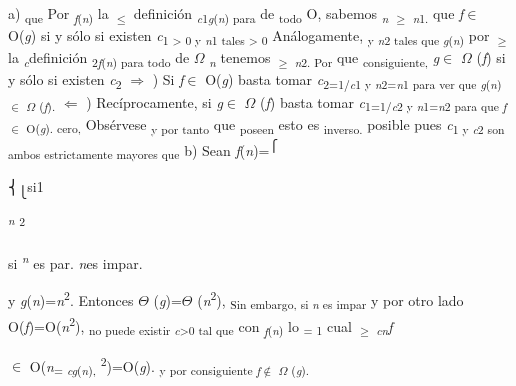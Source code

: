 \documentclass[12pt]{article}
\renewcommand{\_}{\kern-1.5pt\textunderscore\kern-1.5pt}
\begin{document}
{\fontsize{10pt}{12.0pt}\selectfont a) \textsubscript{que }Por \textit{\textsubscript{f}}\textsubscript{(\textit{n}) }la \textsubscript{$ \leq $  }definición \textit{\textsubscript{c}}\textsubscript{1\textit{g}(\textit{n}) para }de \textsubscript{todo }O, sabemos \textit{\textsubscript{n }}\textsubscript{$ \geq $  \textit{n}1. }que \textit{f}$ \in $ O(\textit{g}) si y sólo si existen \textit{c}\textsubscript{1 > 0 y \textit{n}1 tales > 0 }Análogamente, \textsubscript{y \textit{n}2 tales que \textit{g}(\textit{n}) }por \textsubscript{$ \geq $  }la \textit{\textsubscript{c}}definición \textsubscript{2\textit{f}(\textit{n}) para todo }de $ \Omega $  \textit{\textsubscript{n }}tenemos \textsubscript{$ \geq $  \textit{n}2. Por }que \textsubscript{consiguiente, }\textit{g}$ \in $ $ \Omega $ (\textit{f}) si y sólo si existen \textit{c}\textsubscript{2 }$ \Rightarrow $ ) Si \textit{f}$ \in $ O(\textit{g}) basta tomar \textit{c}\textsubscript{2=1/\textit{c}1 y \textit{n}2=\textit{n}1 para ver que \textit{g}(\textit{n})$ \in $ $ \Omega $ (\textit{f}). }$ \Leftarrow $ ) Recíprocamente, si \textit{g}$ \in $ $ \Omega $ (\textit{f}) basta tomar \textit{c}\textsubscript{1=1/\textit{c}2 y \textit{n}1=\textit{n}2 para que \textit{f}$ \in $ O(\textit{g}). cero, }Obsérvese \textsubscript{y por tanto }que \textsubscript{poseen }esto es \textsubscript{inverso. }posible pues \textit{c}\textsubscript{1 y \textit{c}2 son ambos estrictamente mayores que }b) Sean \textit{f}(\textit{n})=\textsuperscript{⎧ }\par}\par

{\fontsize{11pt}{13.2pt}\selectfont ⎨\textsubscript{⎩}si1 \par}\par

\textit{\textsuperscript{n }}\textsuperscript{2 }\par

\begin{Center}
{\fontsize{11pt}{13.2pt}\selectfont si \textit{\textsuperscript{n }}es par. \textit{n}es impar. {\fontsize{10pt}{12.0pt}\selectfont y \textit{g}(\textit{n})=\textit{n}\textsuperscript{2}. Entonces $ \Theta $ (\textit{g})=$ \Theta $ (\textit{n}\textsuperscript{2}), \textsubscript{Sin embargo, si \textit{n }es impar }y por otro lado O(\textit{f})=O(\textit{n}\textsuperscript{2}), \textsubscript{no puede existir \textit{c}>0 tal que }con \textit{\textsubscript{f}}\textsubscript{(\textit{n}) }lo \textsubscript{= 1 }cual \textsubscript{$ \geq $  \textit{cn}}\textit{f }{\fontsize{7pt}{8.4pt} {\fontsize{10pt}{12.0pt}\selectfont $ \in $ O(\textit{n}\textsubscript{= \textit{cg}(\textit{n}), }\textsuperscript{2})=O(\textit{g}). \textsubscript{y por consiguiente \textit{f}$ \notin $ $ \Omega $ (\textit{g}). }\par}\par}\par}\par}
\end{Center}\par
\end{document}
